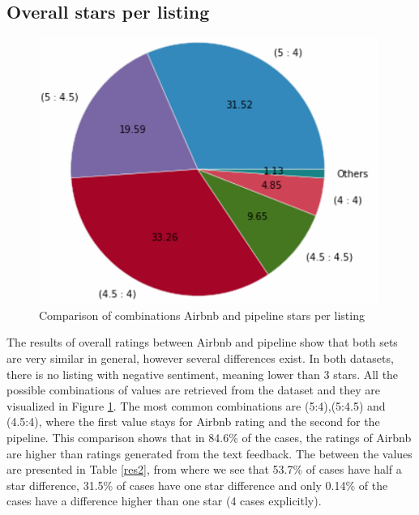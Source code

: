 \subsection{Overall stars per listing}
\label{overallstars}
%
\begin{figure}
\centering
	\includegraphics[height=0.27\textheight]{star_combinations}
	\caption{Comparison of combinations Airbnb and pipeline stars per listing}
	\label{fig:comb1}
\end{figure}
%
The results of overall ratings between Airbnb and pipeline show that both sets are very similar in general, however several differences exist. In both datasets, there is no listing with negative sentiment, meaning lower than 3 stars. All the possible combinations of values are retrieved from the dataset and they are visualized in Figure \ref{fig:comb1}. The most common combinations are (5:4),(5:4.5) and (4.5:4), where the first value stays for Airbnb rating and the second for the pipeline. This comparison shows that in 84.6\% of the cases, the ratings of Airbnb are higher than ratings generated from the text feedback. The between the values are presented in Table \ref{res2}, from where we see that 53.7\% of cases have half a star difference, 31.5\% of cases have one star difference and only 0.14\% of the cases have a difference higher than one star (4 cases explicitly). 
%
